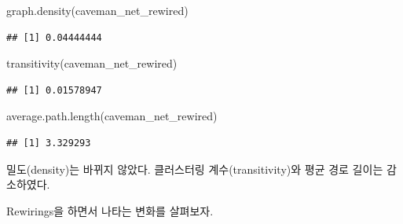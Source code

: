 \documentclass[
]{book}
\newenvironment{Shaded}{\begin{snugshade}}{\end{snugshade}}
\newcommand{\FunctionTok}[1]{\textcolor[rgb]{0.00,0.00,0.00}{#1}}
\newcommand{\NormalTok}[1]{#1}
\begin{document}
\begin{Shaded}
\begin{Highlighting}[]
\FunctionTok{graph.density}\NormalTok{(caveman\_net\_rewired) }
\end{Highlighting}
\end{Shaded}

\begin{verbatim}
## [1] 0.04444444
\end{verbatim}

\begin{Shaded}
\begin{Highlighting}[]
\FunctionTok{transitivity}\NormalTok{(caveman\_net\_rewired) }
\end{Highlighting}
\end{Shaded}

\begin{verbatim}
## [1] 0.01578947
\end{verbatim}

\begin{Shaded}
\begin{Highlighting}[]
\FunctionTok{average.path.length}\NormalTok{(caveman\_net\_rewired)}
\end{Highlighting}
\end{Shaded}

\begin{verbatim}
## [1] 3.329293
\end{verbatim}

밀도(density)는 바뀌지 않았다. 클러스터링 계수(transitivity)와 평균 경로 길이는 감소하였다.

Rewirings을 하면서 나타는 변화를 살펴보자.
\end{document}

